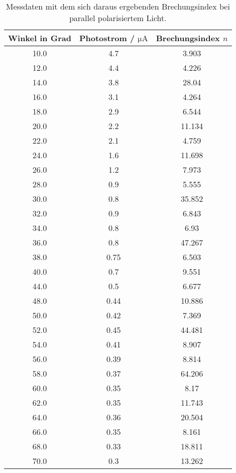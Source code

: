 \begin{table}[H]
    \centering
    \caption{Messdaten mit dem sich daraus ergebenden Brechungsindex bei parallel polarisiertem Licht.}
    \label{tab:ppolMess}
    \begin{tabular}{c c c}
        \toprule
        Winkel in Grad & Photostrom / $\si{\micro\ampere}$  & Brechungsindex $n$ \\
        \midrule
        10.0  &  4.7  &  3.903  \\
        12.0  &  4.4  &  4.226  \\
        14.0  &  3.8  &  28.04  \\
        16.0  &  3.1  &  4.264  \\
        18.0  &  2.9  &  6.544  \\
        20.0  &  2.2  &  11.134  \\
        22.0  &  2.1  &  4.759  \\
        24.0  &  1.6  &  11.698  \\
        26.0  &  1.2  &  7.973  \\
        28.0  &  0.9  &  5.555  \\
        30.0  &  0.8  &  35.852  \\
        32.0  &  0.9  &  6.843  \\
        34.0  &  0.8  &  6.93  \\
        36.0  &  0.8  &  47.267  \\
        38.0  &  0.75  &  6.503  \\
        40.0  &  0.7  &  9.551  \\
        44.0  &  0.5  &  6.677  \\
        48.0  &  0.44  &  10.886  \\
        50.0  &  0.42  &  7.369  \\
        52.0  &  0.45  &  44.481  \\
        54.0  &  0.41  &  8.907  \\
        56.0  &  0.39  &  8.814  \\
        58.0  &  0.37  &  64.206  \\
        60.0  &  0.35  &  8.17  \\
        62.0  &  0.35  &  11.743  \\
        64.0  &  0.36  &  20.504  \\
        66.0  &  0.35  &  8.161  \\
        68.0  &  0.33  &  18.811  \\
        70.0  &  0.3  &  13.262  \\

\end{tabular}
\end{table}
